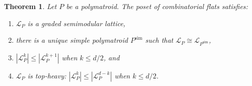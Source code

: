 \documentclass[11pt]{article}
\newtheorem{theo}{Theorem}[section]
\theoremstyle{definition}
\numberwithin{equation}{section}
\newcommand{\simp}{\mathrm{sim}}
\begin{document}
\begin{theo}\label{combo}
  Let $P$ be a polymatroid. The poset of combinatorial flats satisfies:
  \begin{enumerate}
  \item \label{combo:semimodularlattice} 
  $\mathcal L_P$ is a graded semimodular lattice,
  \item \label{combo:simple} there is a unique simple polymatroid $P^\simp$ such that $\mathcal L_P \cong \mathcal L_{P^\simp}$,
  \item $|\mathcal L_P^k| \leq |\mathcal L_P^{k+1}|$ when $k \leq d/2$, and
  \item \label{combo:topheavy} $\mathcal L_P$ is top-heavy: $|\mathcal L_P^k| \leq |\mathcal L_P^{d-k}|$ when $k \leq d/2$.
  \end{enumerate}
\end{theo}
\end{document}

